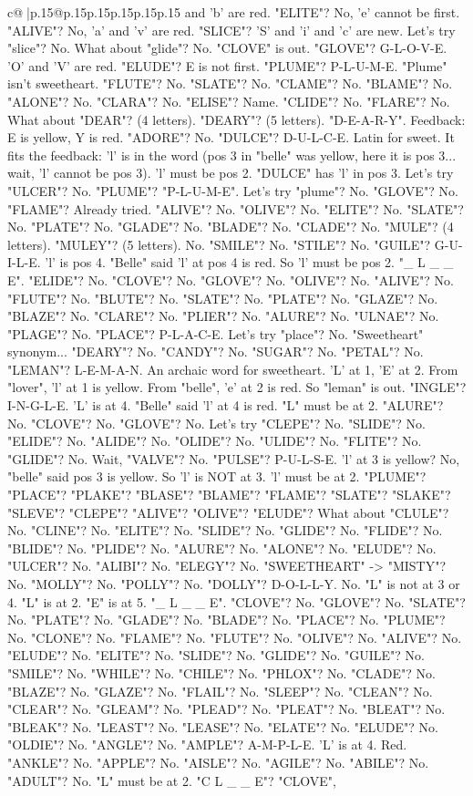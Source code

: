 \documentclass{article}
\begin{document}
{\begin{supertabular}{c@{$\;$}|p{.15\linewidth}@{}p{.15\linewidth}p{.15\linewidth}p{.15\linewidth}p{.15\linewidth}p{.15\linewidth}}
{{{and 'b' are red. "ELITE"? No, 'e' cannot be first. "ALIVE"? No, 'a' and 'v' are red. "SLICE"? 'S' and 'i' and 'c' are new. Let's try "slice"? No. What about "glide"? No. "CLOVE" is out. "GLOVE"? G{-}L{-}O{-}V{-}E. 'O' and 'V' are red. "ELUDE"? E is not first. "PLUME"? P{-}L{-}U{-}M{-}E. "Plume" isn't sweetheart. "FLUTE"? No. "SLATE"? No. "CLAME"? No. "BLAME"? No. "ALONE"? No. "CLARA"? No. "ELISE"? Name. "CLIDE"? No. "FLARE"? No. What about "DEAR"? (4 letters). "DEARY"? (5 letters). "D{-}E{-}A{-}R{-}Y". Feedback: E is yellow, Y is red. "ADORE"? No. "DULCE"? D{-}U{-}L{-}C{-}E. Latin for sweet. It fits the feedback: 'l' is in the word (pos 3 in "belle" was yellow, here it is pos 3... wait, 'l' cannot be pos 3). 'l' must be pos 2. "DULCE" has 'l' in pos 3. Let's try "ULCER"? No. "PLUME"? "P{-}L{-}U{-}M{-}E". Let's try "plume"? No. "GLOVE"? No. "FLAME"? Already tried. "ALIVE"? No. "OLIVE"? No. "ELITE"? No. "SLATE"? No. "PLATE"? No. "GLADE"? No. "BLADE"? No. "CLADE"? No. "MULE"? (4 letters). "MULEY"? (5 letters). No. "SMILE"? No. "STILE"? No. "GUILE"? G{-}U{-}I{-}L{-}E. 'l' is pos 4. "Belle" said 'l' at pos 4 is red. So 'l' must be pos 2. "\_ L \_ \_ E". "ELIDE"? No. "CLOVE"? No. "GLOVE"? No. "OLIVE"? No. "ALIVE"? No. "FLUTE"? No. "BLUTE"? No. "SLATE"? No. "PLATE"? No. "GLAZE"? No. "BLAZE"? No. "CLARE"? No. "PLIER"? No. "ALURE"? No. "ULNAE"? No. "PLAGE"? No. "PLACE"? P{-}L{-}A{-}C{-}E. Let's try "place"? No. "Sweetheart" synonym... "DEARY"? No. "CANDY"? No. "SUGAR"? No. "PETAL"? No. "LEMAN"? L{-}E{-}M{-}A{-}N. An archaic word for sweetheart. 'L' at 1, 'E' at 2. From "lover", 'l' at 1 is yellow. From "belle", 'e' at 2 is red. So "leman" is out. "INGLE"? I{-}N{-}G{-}L{-}E. 'L' is at 4. "Belle" said 'l' at 4 is red. "L" must be at 2. "ALURE"? No. "CLOVE"? No. "GLOVE"? No. Let's try "CLEPE"? No. "SLIDE"? No. "ELIDE"? No. "ALIDE"? No. "OLIDE"? No. "ULIDE"? No. "FLITE"? No. "GLIDE"? No. Wait, "VALVE"? No. "PULSE"? P{-}U{-}L{-}S{-}E. 'l' at 3 is yellow? No, "belle" said pos 3 is yellow. So 'l' is NOT at 3. 'l' must be at 2. "PLUME"? "PLACE"? "PLAKE"? "BLASE"? "BLAME"? "FLAME"? "SLATE"? "SLAKE"? "SLEVE"? "CLEPE"? "ALIVE"? "OLIVE"? "ELUDE"? What about "CLULE"? No. "CLINE"? No. "ELITE"? No. "SLIDE"? No. "GLIDE"? No. "FLIDE"? No. "BLIDE"? No. "PLIDE"? No. "ALURE"? No. "ALONE"? No. "ELUDE"? No. "ULCER"? No. "ALIBI"? No. "ELEGY"? No. "SWEETHEART" {-}> "MISTY"? No. "MOLLY"? No. "POLLY"? No. "DOLLY"? D{-}O{-}L{-}L{-}Y. No. "L" is not at 3 or 4. "L" is at 2. "E" is at 5. "\_ L \_ \_ E". "CLOVE"? No. "GLOVE"? No. "SLATE"? No. "PLATE"? No. "GLADE"? No. "BLADE"? No. "PLACE"? No. "PLUME"? No. "CLONE"? No. "FLAME"? No. "FLUTE"? No. "OLIVE"? No. "ALIVE"? No. "ELUDE"? No. "ELITE"? No. "SLIDE"? No. "GLIDE"? No. "GUILE"? No. "SMILE"? No. "WHILE"? No. "CHILE"? No. "PHLOX"? No. "CLADE"? No. "BLAZE"? No. "GLAZE"? No. "FLAIL"? No. "SLEEP"? No. "CLEAN"? No. "CLEAR"? No. "GLEAM"? No. "PLEAD"? No. "PLEAT"? No. "BLEAT"? No. "BLEAK"? No. "LEAST"? No. "LEASE"? No. "ELATE"? No. "ELUDE"? No. "OLDIE"? No. "ANGLE"? No. "AMPLE"? A{-}M{-}P{-}L{-}E. 'L' is at 4. Red. "ANKLE"? No. "APPLE"? No. "AISLE"? No. "AGILE"? No. "ABILE"? No. "ADULT"? No. "L" must be at 2. "C L \_ \_ E"? "CLOVE", }}}
\end{supertabular}}
\end{document}
